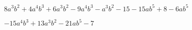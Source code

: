 
\question $8a^3b^2 + 4a^4b^3 + 6a^3b^2 - 9a^4b^3 - a^3b^2
           - 15 - 15ab^5 + 8 - 6ab^5$
  \begin{solution}[1cm]
    $-15a^4b^3 + 13a^3b^2 - 21ab^5 - 7$
  \end{solution}
